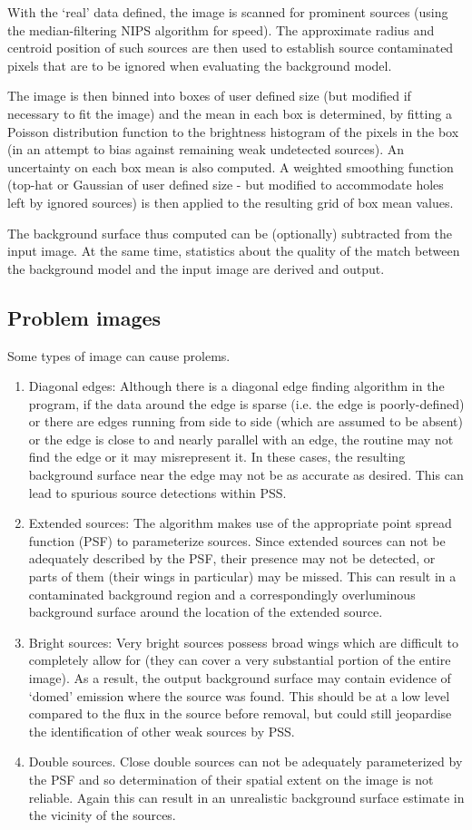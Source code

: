 \documentclass{book}
\renewcommand{\_}{{\tt\char'137}}     %
\begin{document}
With the `real' data defined, the image is scanned for prominent sources
(using the median-filtering NIPS algorithm for speed). The approximate
radius and centroid position of such sources are then used to establish
source contaminated pixels that are to be ignored when evaluating the
background model.

The image is then binned into boxes of user defined size (but modified
if necessary to fit the image) and the mean in each box is determined,
by fitting a Poisson distribution function to the brightness histogram
of the pixels in the box (in an attempt to bias against remaining
weak undetected sources). An uncertainty on each box mean is also computed.
A weighted smoothing function (top-hat or Gaussian of user defined size
- but modified to accommodate holes left by ignored sources) is then applied
to the resulting grid of box mean values.

The background surface thus computed can be (optionally) subtracted from the
input image. At the same time, statistics about the quality of the
match between the background model and the input image are derived and
output.

\subsection{Problem images}
Some types of image can cause prolems.

\begin{enumerate}
\item Diagonal edges: Although there is a diagonal edge finding algorithm
in the program, if the data around the edge is sparse (i.e. the
edge is poorly-defined) or there are edges running from side to
side (which are assumed to be absent) or the edge is close to and
nearly parallel with an edge, the routine may not find the edge or it
may misrepresent it. In these cases, the resulting background surface
near the edge may not be as accurate as desired. This can lead to
spurious source detections within PSS.
\item Extended sources: The algorithm makes use of the appropriate point
spread function (PSF) to parameterize sources. Since extended
sources can not be adequately described by the PSF, their presence
may not be detected, or parts of them (their wings in particular)
may be missed. This can result in a contaminated background
region and a correspondingly overluminous background surface
around the location of the extended source.
\item Bright sources: Very bright sources possess broad wings which
are difficult to completely allow for (they can cover a very
substantial portion of the entire image). As a result, the
output background surface may contain evidence of `domed'
emission where the source was found. This should be at a
low level compared to the flux in the source before removal,
but could still jeopardise the identification of other weak
sources by PSS.
\item Double sources. Close double sources can not be adequately
parameterized by the PSF and so determination of their
spatial extent on the image is not reliable. Again this
can result in an unrealistic background surface estimate
in the vicinity of the sources.
\end{enumerate}
\end{document}
